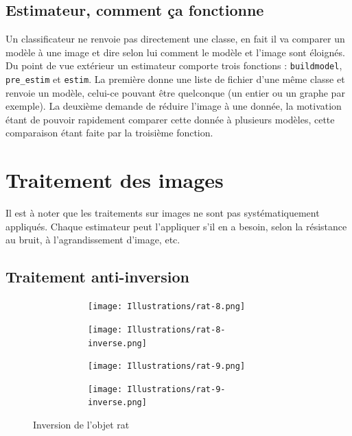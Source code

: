\documentclass{article}
\begin{document}
  	   \subsection{Estimateur, comment ça fonctionne}
	Un classificateur ne renvoie pas directement une classe, en fait il va comparer un modèle à une image et dire selon lui comment le modèle et l'image sont éloignés. Du point de vue extérieur un estimateur comporte trois fonctions : \verb-buildmodel-, \verb-pre_estim- et \verb-estim-. La première donne une liste de fichier d'une même classe et renvoie un modèle, celui-ce pouvant être quelconque (un entier ou un graphe par exemple). La deuxième demande de réduire l'image à une donnée, la motivation étant de pouvoir rapidement comparer cette donnée à plusieurs modèles, cette comparaison étant faite par la troisième fonction.
  
  
  \section{Traitement des images}
  
  	Il est à noter que les traitements sur images ne sont pas systématiquement appliqués. Chaque estimateur peut l'appliquer s'il en a besoin, selon la résistance au bruit, à l'agrandissement d'image, etc.
  
    \subsection{Traitement anti-inversion}
    
      \begin{figure}[!h]
	\centering
	\begin{subfigure}{.49\textwidth}
	  \begin{subfigure}{.49\textwidth}
	    \centering
	    \texttt{[image: Illustrations/rat-8.png]}
	    \label{1strat}
	  \end{subfigure}
	  \begin{subfigure}{.49\textwidth}
	    \centering
	    \texttt{[image: Illustrations/rat-8-inverse.png]}
	    \label{1strat-inverse}
	  \end{subfigure}
	\end{subfigure}
	\begin{subfigure}{.49\textwidth}
	  \begin{subfigure}{.49\textwidth}
	    \centering
	    \texttt{[image: Illustrations/rat-9.png]}
	  \label{2ndrat}
	  \end{subfigure}
	  \begin{subfigure}{.49\textwidth}
	    \centering
	    \texttt{[image: Illustrations/rat-9-inverse.png]}
	  \label{2ndrat-inverse}
	  \end{subfigure}
	\end{subfigure}
	\caption{Inversion de l'objet rat}
	\label{anti-inversion}
      \end{figure}
\end{document}
